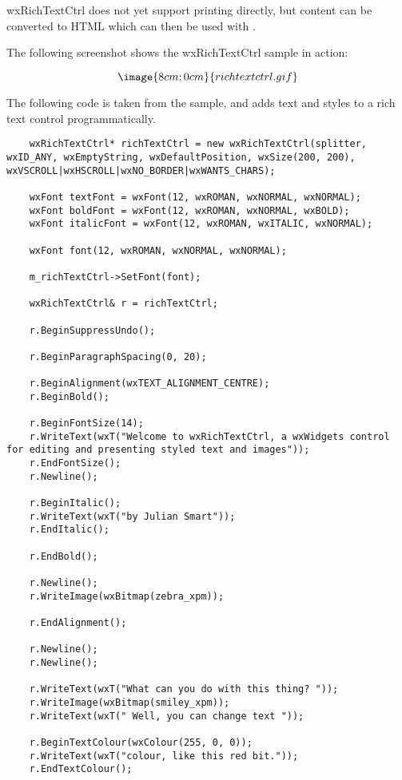 wxRichTextCtrl does not yet support printing directly, but content can be converted
to HTML which can then be used with .

The following screenshot shows the wxRichTextCtrl sample in action:

$$\image{8cm;0cm}{richtextctrl.gif}$$

\label{wxrichtextctrlexample}

The following code is taken from the sample, and adds text and styles to a rich text control programmatically.

{\small
\begin{verbatim}
    wxRichTextCtrl* richTextCtrl = new wxRichTextCtrl(splitter, wxID_ANY, wxEmptyString, wxDefaultPosition, wxSize(200, 200), wxVSCROLL|wxHSCROLL|wxNO_BORDER|wxWANTS_CHARS);

    wxFont textFont = wxFont(12, wxROMAN, wxNORMAL, wxNORMAL);
    wxFont boldFont = wxFont(12, wxROMAN, wxNORMAL, wxBOLD);
    wxFont italicFont = wxFont(12, wxROMAN, wxITALIC, wxNORMAL);

    wxFont font(12, wxROMAN, wxNORMAL, wxNORMAL);

    m_richTextCtrl->SetFont(font);

    wxRichTextCtrl& r = richTextCtrl;

    r.BeginSuppressUndo();

    r.BeginParagraphSpacing(0, 20);

    r.BeginAlignment(wxTEXT_ALIGNMENT_CENTRE);
    r.BeginBold();

    r.BeginFontSize(14);
    r.WriteText(wxT("Welcome to wxRichTextCtrl, a wxWidgets control for editing and presenting styled text and images"));
    r.EndFontSize();
    r.Newline();

    r.BeginItalic();
    r.WriteText(wxT("by Julian Smart"));
    r.EndItalic();

    r.EndBold();

    r.Newline();
    r.WriteImage(wxBitmap(zebra_xpm));

    r.EndAlignment();

    r.Newline();
    r.Newline();

    r.WriteText(wxT("What can you do with this thing? "));
    r.WriteImage(wxBitmap(smiley_xpm));
    r.WriteText(wxT(" Well, you can change text "));

    r.BeginTextColour(wxColour(255, 0, 0));
    r.WriteText(wxT("colour, like this red bit."));
    r.EndTextColour();


\end{verbatim}}
